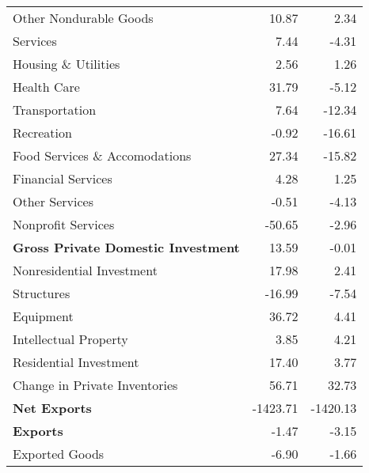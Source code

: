 \documentclass[11pt, letterpaper]{article}\usepackage[]{graphicx}\usepackage[]{color}
\begin{document}
\begin{table}[H]
\begin{tabular}{lrr}
  \hspace{24mm}  Other Nondurable Goods & 10.87 & 2.34 \\ 
  \hspace{8mm}  Services & 7.44 & -4.31 \\ 
  \hspace{16mm}  Housing \& Utilities & 2.56 & 1.26 \\ 
  \hspace{16mm}  Health Care & 31.79 & -5.12 \\ 
  \hspace{16mm}  Transportation & 7.64 & -12.34 \\ 
  \hspace{16mm}  Recreation & -0.92 & -16.61 \\ 
  \hspace{16mm}  Food Services \& Accomodations & 27.34 & -15.82 \\ 
  \hspace{16mm}  Financial Services & 4.28 & 1.25 \\ 
  \hspace{16mm}  Other Services & -0.51 & -4.13 \\ 
  \hspace{16mm}  Nonprofit Services & -50.65 & -2.96 \\ 
  \hspace{0mm} \textbf{Gross Private Domestic Investment} & 13.59 & -0.01 \\ 
  \hspace{8mm}  Nonresidential Investment & 17.98 & 2.41 \\ 
  \hspace{16mm}  Structures & -16.99 & -7.54 \\ 
  \hspace{16mm}  Equipment & 36.72 & 4.41 \\ 
  \hspace{16mm}  Intellectual Property & 3.85 & 4.21 \\ 
  \hspace{8mm}  Residential Investment & 17.40 & 3.77 \\ 
  \hspace{8mm}  Change in Private Inventories & 56.71 & 32.73 \\ 
  \hspace{0mm} \textbf{Net Exports} & -1423.71 & -1420.13 \\ 
  \hspace{0mm} \textbf{Exports} & -1.47 & -3.15 \\ 
  \hspace{8mm}  Exported Goods & -6.90 & -1.66 \\ 

\end{tabular}
\end{table}
\end{document}
